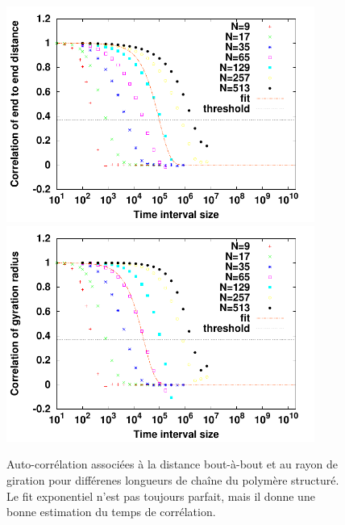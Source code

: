 \begin{figure}[H]
\begin{center}
\includegraphics[width=0.9\textwidth]{correlendtoend.pdf}
\includegraphics[width=0.9\textwidth]{correlgyr.pdf}

\caption[Résultats numériques: estimation des temps de corrélation]{Auto-corrélation associées à la distance bout-à-bout et au rayon de giration pour différenes longueurs de chaîne du polymère structuré. Le fit exponentiel n'est pas toujours parfait, mais il donne une bonne estimation du temps de corrélation.}
\label{correl}
\end{center}
\end{figure}

